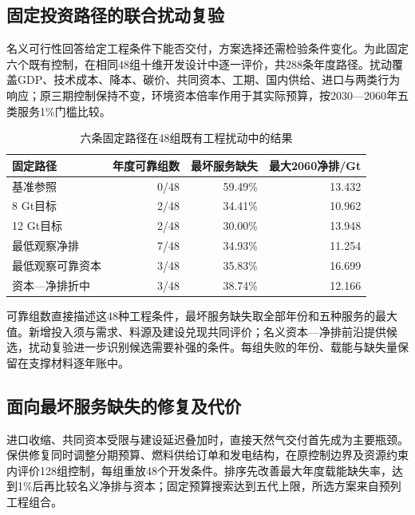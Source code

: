 \subsection{固定投资路径的联合扰动复验}
名义可行性回答给定工程条件下能否交付，方案选择还需检验条件变化。为此固定六个既有控制，在相同48组十维开发设计中逐一评价，共288条年度路径。扰动覆盖GDP、技术成本、降本、碳价、共同资本、工期、国内供给、进口与两类行为响应；原三期控制保持不变，环境资本倍率作用于其实际预算，按2030—2060年五类服务1\%门槛比较。

\begin{table}[H]\centering\caption{六条固定路径在48组既有工程扰动中的结果}
\begin{tabular}{lrrr}\toprule
固定路径 & 年度可靠组数 & 最坏服务缺失 & 最大2060净排/Gt\\\midrule
基准参照 & 0/48 & 59.49\% & 13.432 \\
8 Gt目标 & 2/48 & 34.41\% & 10.962 \\
12 Gt目标 & 2/48 & 30.00\% & 13.948 \\
最低观察净排 & 7/48 & 34.93\% & 11.254 \\
最低观察可靠资本 & 3/48 & 35.83\% & 16.699 \\
资本—净排折中 & 3/48 & 38.74\% & 12.166 \\
\bottomrule\end{tabular}\end{table}
可靠组数直接描述这48种工程条件，最坏服务缺失取全部年份和五种服务的最大值。新增投入须与需求、料源及建设兑现共同评价；名义资本—净排前沿提供候选，扰动复验进一步识别候选需要补强的条件。每组失败的年份、载能与缺失量保留在支撑材料逐年账中。

\subsection{面向最坏服务缺失的修复及代价}
进口收缩、共同资本受限与建设延迟叠加时，直接天然气交付首先成为主要瓶颈。保供修复同时调整分期预算、燃料供给订单和发电结构，在原控制边界及资源约束内评价128组控制，每组重放48个开发条件。排序先改善最大年度载能缺失率，达到1\%后再比较名义净排与资本；固定预算搜索达到五代上限，所选方案来自预列工程组合。

